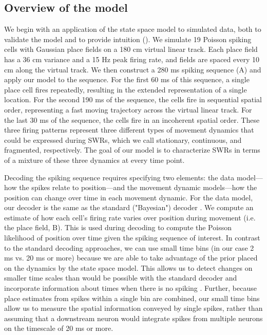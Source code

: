 \documentclass[9pt,lineno]{elife}
\begin{document}
\subsection*{Overview of the model}
We begin with an application of the state space model to simulated data, both to validate the model and to provide intuition (). We simulate 19 Poisson spiking cells with Gaussian place fields on a 180 cm virtual linear track. Each place field has a 36 cm variance and a 15 Hz peak firing rate, and fields are spaced every 10 cm along the virtual track. We then construct a 280 ms spiking sequence (A) and apply our model to the sequence. For the first 60 ms of this sequence, a single place cell fires repeatedly, resulting in the extended representation of a single location. For the second 190 ms of the sequence, the cells fire in sequential spatial order, representing a fast moving trajectory across the virtual linear track. For the last 30 ms of the sequence, the cells fire in an incoherent spatial order. These three firing patterns represent three different types of movement dynamics that could be expressed during SWRs, which we call stationary, continuous, and fragmented, respectively. The goal of our model is to characterize SWRs in terms of a mixture of these three dynamics at every time point.

Decoding the spiking sequence requires specifying two elements: the data model---how the spikes relate to position---and the movement dynamic models---how the position can change over time in each movement dynamic. For the data model, our decoder is the same as the standard ("Bayesian") decoder \citep{DavidsonHippocampalReplayExtended2009, PfeifferAutoassociativedynamicsgeneration2015, StellaHippocampalReactivationRandom2019}. We compute an estimate of how each cell's firing rate varies over position during movement (i.e. the place field, B). This is used during decoding to compute the Poisson likelihood of position over time given the spiking sequence of interest. In contrast to the standard decoding approaches, we can use small time bins (in our case 2 ms vs. 20 ms or more) because we are able to take advantage of the prior placed on the dynamics by the state space model. This allows us to detect changes on smaller time scales than would be possible with the standard decoder and incorporate information about times when there is no spiking \citep{DengClusterlessDecodingPosition2015}. Further, because place estimates from spikes within a single bin are combined, our small time bins allow us to measure the spatial information conveyed by single spikes, rather than assuming that a downstream neuron would integrate spikes from multiple neurons on the timescale of 20 ms or more.
\end{document}
